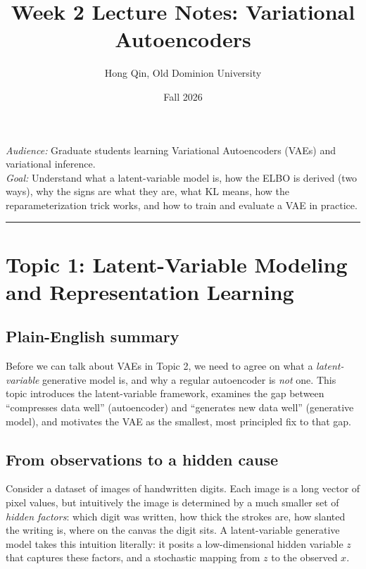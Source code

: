 \documentclass[11pt]{article}
\title{Week 2 Lecture Notes: Variational Autoencoders}
\author{Hong Qin, Old Dominion University}
\date{Fall 2026}
\newcommand{\KL}{\mathrm{KL}}
\theoremstyle{remark}
\begin{document}
\setlength{\emergencystretch}{2em} %
\maketitle

\begin{center}
\textit{Audience:} Graduate students learning Variational Autoencoders (VAEs) and variational inference.\\
\textit{Goal:} Understand what a latent-variable model is, how the ELBO is derived (two ways), why the signs are what they are, what $\KL$ means, how the reparameterization trick works, and how to train and evaluate a VAE in practice.
\end{center}

\tableofcontents

\bigskip
\hrule
\vspace{1em}

\section{Topic 1: Latent-Variable Modeling and Representation Learning}

\subsection{Plain-English summary}
Before we can talk about VAEs in Topic 2, we need to agree on what a \emph{latent-variable} generative model is, and why a regular autoencoder is \emph{not} one. This topic introduces the latent-variable framework, examines the gap between ``compresses data well'' (autoencoder) and ``generates new data well'' (generative model), and motivates the VAE as the smallest, most principled fix to that gap.

\subsection{From observations to a hidden cause}
Consider a dataset of images of handwritten digits. Each image is a long vector of pixel values, but intuitively the image is determined by a much smaller set of \emph{hidden factors}: which digit was written, how thick the strokes are, how slanted the writing is, where on the canvas the digit sits. A latent-variable generative model takes this intuition literally: it posits a low-dimensional hidden variable $z$ that captures these factors, and a stochastic mapping from $z$ to the observed $x$.
\end{document}
